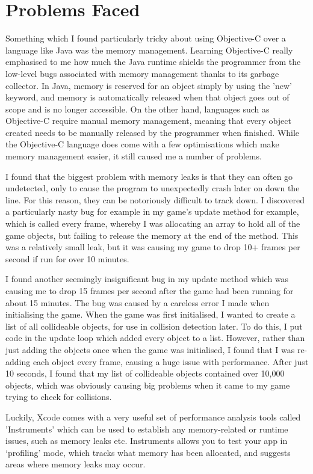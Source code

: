 \documentclass[a4paper,oneside]{report}
\begin{document}
\section{Problems Faced} 

Something which I found particularly tricky about using Objective-C over a language like Java was the memory management. Learning Objective-C really emphasised to me how much the Java runtime shields the programmer from the low-level bugs associated with memory management thanks to its garbage collector. In Java, memory is reserved for an object simply by using the 'new' keyword, and memory is automatically released when that object goes out of scope and is no longer accessible. On the other hand, languages such as Objective-C  require manual memory management, meaning that every object created needs to be manually released by the programmer when finished. While the Objective-C language does come with a few optimisations which make memory management easier, it still caused me a number of problems. 

I found that the biggest problem with memory leaks is that they can often go undetected, only to cause the program to unexpectedly crash later on down the line. For this reason, they can be notoriously difficult to track down. I discovered a particularly nasty bug for example in my game's update method for example, which is called every frame, whereby I was allocating an array to hold all of the game objects, but failing to release the memory at the end of the method. This was a relatively small leak, but it was causing my game to drop 10+ frames per second if run for over 10 minutes.

I found another seemingly insignificant bug in my update method which was causing me to drop 15 frames per second after the game had been running for about 15 minutes. The bug was caused by a careless error I made when initialising the game. When the game was first initialised, I wanted to create a list of all collideable objects, for use in collision detection later. To do this, I put code in the update loop which added every object to a list. However, rather than just adding the objects once when the game was initialised, I found that I was re-adding each object every frame, causing a huge issue with performance. After just 10 seconds, I found that my list of collideable objects contained over 10,000 objects, which was obviously causing big problems when it came to my game trying to check for collisions.

Luckily, Xcode comes with a very useful set of performance analysis tools called 'Instruments' which can be used to establish any memory-related or runtime issues, such as memory leaks etc. Instruments allows you to test your app in `profiling' mode, which tracks what memory has been allocated, and suggests areas where memory leaks may occur.
\end{document}
